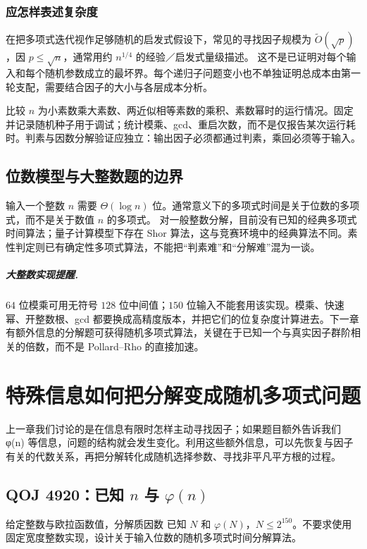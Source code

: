 \subsection{应怎样表述复杂度}
在把多项式迭代视作足够随机的启发式假设下，常见的寻找因子规模为 $\widetilde O(\sqrt p)$，因 $p\le\sqrt n$，通常用约 $n^{1/4}$ 的经验／启发式量级描述。
这不是已证明对每个输入和每个随机参数成立的最坏界。每个递归子问题变小也不单独证明总成本由第一轮支配，需要结合因子的大小与各层成本分析。

\begin{teach}[给学生的实验任务]
比较 $n$ 为小素数乘大素数、两近似相等素数的乘积、素数幂时的运行情况。固定并记录随机种子用于调试；统计模乘、gcd、重启次数，而不是仅报告某次运行耗时。判素与因数分解验证应独立：输出因子必须都通过判素，乘回必须等于输入。
\end{teach}


\section{位数模型与大整数题的边界}
输入一个整数 $n$ 需要 $\Theta(\log n)$ 位。通常意义下的多项式时间是关于位数的多项式，而不是关于数值 $n$ 的多项式。
对一般整数分解，目前没有已知的经典多项式时间算法；量子计算模型下存在 Shor 算法，这与竞赛环境中的经典算法不同。素性判定则已有确定性多项式算法，不能把“判素难”和“分解难”混为一谈。

\paragraph{大整数实现提醒.} $64$ 位模乘可用无符号 $128$ 位中间值；$150$ 位输入不能套用该实现。模乘、快速幂、开整数根、gcd 都要换成高精度版本，并把它们的位复杂度计算进去。下一章有额外信息的分解题可获得随机多项式算法，关键在于已知一个与真实因子群阶相关的倍数，而不是 Pollard--Rho 的直接加速。



\chapter{特殊信息如何把分解变成随机多项式问题}
\begin{chapterintro}[章节导读]
上一章我们讨论的是在信息有限时怎样主动寻找因子；如果题目额外告诉我们 φ(n) 等信息，问题的结构就会发生变化。利用这些额外信息，可以先恢复与因子有关的代数关系，再把分解转化成随机选择参数、寻找非平凡平方根的过程。
\end{chapterintro}

\section{QOJ 4920：已知 \texorpdfstring{$n$}{n} 与 \texorpdfstring{$\varphi(n)$}{phi(n)}}
\begin{problem}{给定整数与欧拉函数值，分解质因数}
已知 $N$ 和 $\varphi(N)$，$N\le2^{150}$。不要求使用固定宽度整数实现，设计关于输入位数的随机多项式时间分解算法。
\end{problem}

